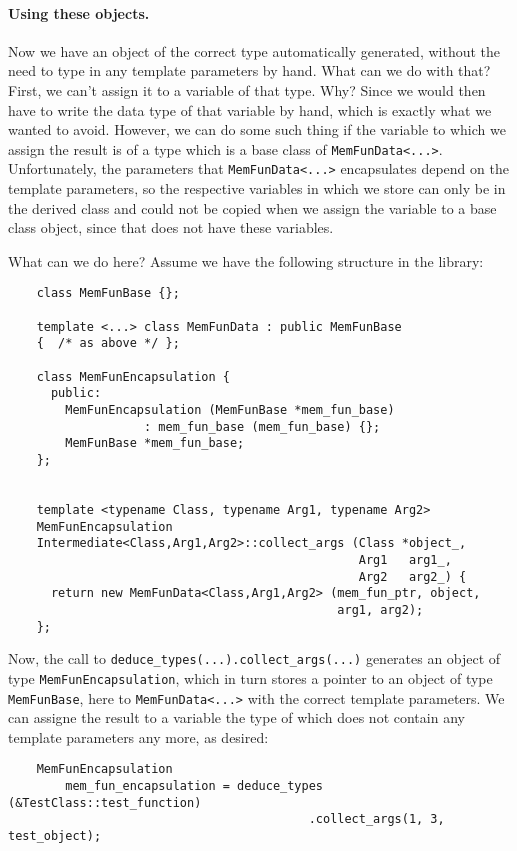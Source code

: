 \documentclass[11pt]{article}
\begin{document}
\paragraph{Using these objects.} Now we have an object of the correct type
automatically generated, without the need to type in any template parameters
by hand. What can we do with that? First, we can't assign it to a variable of
that type. Why? Since we would then have to write the data type of that
variable by hand, which is exactly what we wanted to avoid. However, we can do
some such thing if the variable to which we assign the result is of a type
which is a base class of \texttt{MemFunData<...>}. Unfortunately, the
parameters that \texttt{MemFunData<...>} encapsulates depend on the
template parameters, so the respective variables in which we store can only be
in the derived class and could not be copied when we assign the variable to a
base class object, since that does not have these variables.

What can we do here? Assume we have the following structure in the library:
\begin{verbatim}
    class MemFunBase {};

    template <...> class MemFunData : public MemFunBase 
    {  /* as above */ };

    class MemFunEncapsulation {
      public:
        MemFunEncapsulation (MemFunBase *mem_fun_base)
                   : mem_fun_base (mem_fun_base) {};
        MemFunBase *mem_fun_base;
    };


    template <typename Class, typename Arg1, typename Arg2>
    MemFunEncapsulation
    Intermediate<Class,Arg1,Arg2>::collect_args (Class *object_,
                                                 Arg1   arg1_,
                                                 Arg2   arg2_) {
      return new MemFunData<Class,Arg1,Arg2> (mem_fun_ptr, object,
                                              arg1, arg2);
    };
\end{verbatim}

Now, the call to \texttt{deduce\_types(...).collect\_args(...)} generates an
object of type \texttt{MemFunEncapsulation}, which in turn stores a pointer to
an object of type \texttt{MemFunBase}, here to \texttt{MemFunData<...>} with
the correct template parameters. We can assigne the result to a variable the
type of which does not contain any template parameters any more, as desired:
\begin{verbatim}
    MemFunEncapsulation 
        mem_fun_encapsulation = deduce_types (&TestClass::test_function)
                                          .collect_args(1, 3, test_object);
\end{verbatim}
\end{document}
